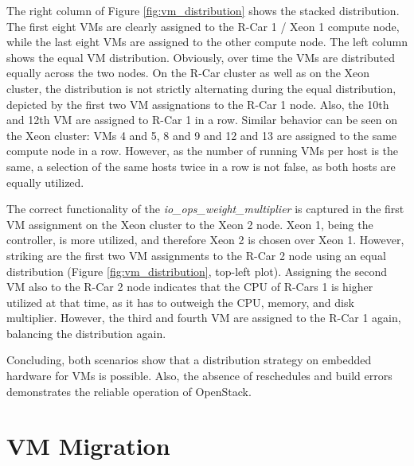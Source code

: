             \noindent The right column of Figure \ref{fig:vm_distribution} shows the stacked distribution.
            The first eight VMs are clearly assigned to the R-Car 1 / Xeon 1 compute node, while the last eight VMs are assigned to the other compute node.
            The left column shows the equal \ac{VM} distribution. 
            Obviously, over time the \acp{VM} are distributed equally across the two nodes.
            On the R-Car cluster as well as on the Xeon cluster, the distribution is not strictly alternating during the equal distribution, depicted by the first two \ac{VM} assignations to the R-Car 1 node.
            Also, the 10th and 12th \ac{VM} are assigned to R-Car 1 in a row.
            Similar behavior can be seen on the Xeon cluster: \acp{VM} 4 and 5, 8 and 9 and 12 and 13 are assigned to the same compute node in a row.
            However, as the number of running \acp{VM} per host is the same, a selection of the same hosts twice in a row is not false, as both hosts are equally utilized.
            
            \noindent The correct functionality of the \textsl{io\_ops\_weight\_multiplier} is captured in the first \ac{VM} assignment on the Xeon cluster to the Xeon 2 node.
            Xeon 1, being the controller, is more utilized, and therefore Xeon 2 is chosen over Xeon 1.
            However, striking are the first two \ac{VM} assignments to the R-Car 2 node using an equal distribution (Figure \ref{fig:vm_distribution}, top-left plot). 
            Assigning the second \ac{VM} also to the R-Car 2 node indicates that the \ac{CPU} of R-Cars 1 is higher utilized at that time, as it has to outweigh the \ac{CPU}, memory, and disk multiplier.
            However, the third and fourth \ac{VM} are assigned to the R-Car 1 again, balancing the distribution again.
            
            \noindent Concluding, both scenarios show that a distribution strategy on embedded hardware for \acp{VM} is possible.
            Also, the absence of reschedules and build errors demonstrates the reliable operation of OpenStack.

        
    \section{VM Migration}
    \label{section:migration}
  
